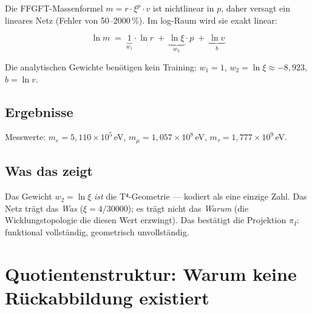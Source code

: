 Die FFGFT-Massenformel $m = r \cdot \xi^p \cdot v$ ist nichtlinear in $p$,
daher versagt ein lineares Netz (Fehler von 50--2000\,\%). Im log-Raum
wird sie exakt linear:

\begin{equation}
  \ln m \;=\; \underbrace{1}_{w_1}\cdot\ln r
           \;+\; \underbrace{\ln\xi}_{w_2}\cdot p
           \;+\; \underbrace{\ln v}_{b}
  \tag{243.11}
\end{equation}

Die analytischen Gewichte benötigen kein Training:
$w_1 = 1$, $w_2 = \ln\xi \approx -8{,}923$, $b = \ln v$.

\subsection{Ergebnisse}

\begin{center}
\renewcommand{\arraystretch}{1.3}
{\small
{}
}
\end{center}

Messwerte: $m_e = 5{,}110\times10^5$\,eV,
$m_\mu = 1{,}057\times10^8$\,eV, $m_\tau = 1{,}777\times10^9$\,eV.

\subsection{Was das zeigt}

Das Gewicht $w_2 = \ln\xi$ \emph{ist} die T⁴-Geometrie --- kodiert als
eine einzige Zahl. Das Netz trägt das \emph{Was} ($\xi = 4/30000$);
es trägt nicht das \emph{Warum} (die Wicklungstopologie die diesen Wert
erzwingt). Das bestätigt die Projektion $\pi_I$: funktional vollständig,
geometrisch unvollständig.

\section{Quotienten\-struktur: Warum keine Rück\-abbildung existiert}

